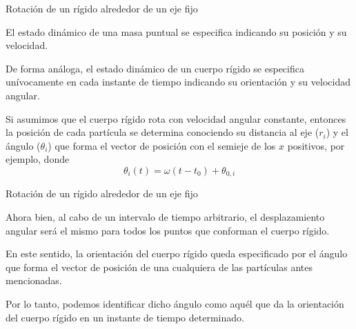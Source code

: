 \documentclass[11pt,handout,aspectratio=1610]{beamer}
\begin{document}
\begin{frame}{Rotación de un rígido alrededor de un eje fijo}

    El estado dinámico de una masa puntual se especifica indicando su posición y su velocidad.

    \vspace{11pt}

    De forma análoga, el estado dinámico de un cuerpo rígido se especifica unívocamente en cada instante de tiempo indicando su orientación y su velocidad angular.

    \vspace{11pt}

    Si asumimos que el cuerpo rígido rota con velocidad angular constante, entonces la posición de cada partícula se determina conociendo su distancia al eje ($r_i$) y el ángulo ($\theta_i$) que forma el vector de posición con el semieje de los $x$ positivos, por ejemplo, donde $$\theta_i (t) = \omega \left(t - t_0\right) + \theta_{0,i}$$
    
\end{frame}

\begin{frame}{Rotación de un rígido alrededor de un eje fijo}

    Ahora bien, al cabo de un intervalo de tiempo arbitrario, el desplazamiento angular será el mismo para todos los puntos que conforman el cuerpo rígido.

    \vspace{11pt}

    En este sentido, la orientación del cuerpo rígido queda especificado por el ángulo que forma el vector de posición de una cualquiera de las partículas antes mencionadas. 
    
    \vspace{11pt}

    Por lo tanto, podemos identificar dicho ángulo como aquél que da la orientación del cuerpo rígido en un instante de tiempo determinado.

\end{frame}
\end{document}
